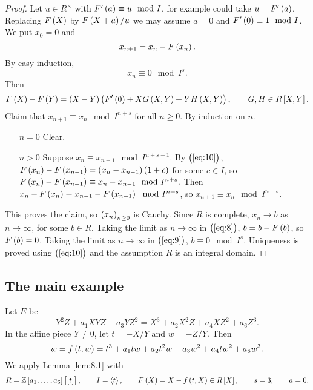 \begin{proof}
Let $ u \in R^\times $ with $ F'\br{a} \equiv u \mod I $, for example could take $ u = F'\br{a} $. Replacing $ F\br{X} $ by $ F\br{X + a} / u $ we may assume $ a = 0 $ and $ F'\br{0} \equiv 1 \mod I $. We put $ x_0 = 0 $ and
\begin{equation}
\label{eq:8}
x_{n + 1} = x_n - F\br{x_n}.
\end{equation}
By easy induction,
\begin{equation}
\label{eq:9}
x_n \equiv 0 \mod I^s.
\end{equation}
Then
\begin{equation}
\label{eq:10}
F\br{X} - F\br{Y} = \br{X - Y}\br{F'\br{0} + XG\br{X, Y} + YH\br{X, Y}}, \qquad G, H \in R\sbr{X, Y}.
\end{equation}
Claim that $ x_{n + 1} \equiv x_n \mod I^{n + s} $ for all $ n \ge 0 $. By induction on $ n $.
\begin{itemize}[leftmargin=0.5in]
\item[$ n = 0 $] Clear.
\item[$ n > 0 $] Suppose $ x_n \equiv x_{n - 1} \mod I^{n + s - 1} $. By $ \br{\ref{eq:10}} $, $ F\br{x_n} - F\br{x_{n - 1}} = \br{x_n - x_{n - 1}}\br{1 + c} $ for some $ c \in I $, so $ F\br{x_n} - F\br{x_{n - 1}} \equiv x_n - x_{n - 1} \mod I^{n + s} $. Then $ x_n - F\br{x_n} \equiv x_{n - 1} - F\br{x_{n - 1}} \mod I^{n + s} $, so $ x_{n + 1} \equiv x_n \mod I^{n + s} $.
\end{itemize}
This proves the claim, so $ \br{x_n}_{n \ge 0} $ is Cauchy. Since $ R $ is complete, $ x_n \to b $ as $ n \to \infty $, for some $ b \in R $. Taking the limit as $ n \to \infty $ in $ \br{\ref{eq:8}} $, $ b = b - F\br{b} $, so $ F\br{b} = 0 $. Taking the limit as $ n \to \infty $ in $ \br{\ref{eq:9}} $, $ b \equiv 0 \mod I^s $. Uniqueness is proved using $ \br{\ref{eq:10}} $ and the assumption $ R $ is an integral domain.
\end{proof}

\subsection{The main example}

Let $ E $ be
$$ Y^2Z + a_1XYZ + a_3YZ^2 = X^3 + a_2X^2Z + a_4XZ^2 + a_6Z^3. $$
In the affine piece $ Y \ne 0 $, let $ t = -X / Y $ and $ w = -Z / Y $. Then
$$ w = f\br{t, w} = t^3 + a_1tw + a_2t^2w + a_3w^2 + a_4tw^2 + a_6w^3. $$
We apply Lemma \ref{lem:8.1} with
$$ R = \ZZ\sbr{a_1, \dots, a_6}\sbr{\sbr{t}}, \qquad I = \abr{t}, \qquad F\br{X} = X - f\br{t, X} \in R\sbr{X}, \qquad s = 3, \qquad a = 0. $$

